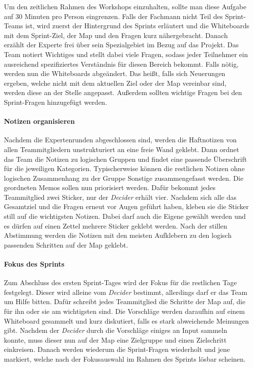 Um den zeitlichen Rahmen des Workshops einzuhalten, sollte man diese Aufgabe auf 30 Minuten pro Person eingrenzen. Falls der Fachmann nicht Teil des Sprint-Teams ist, wird zuerst der Hintergrund des Sprints erläutert und die Whiteboards mit dem Sprint-Ziel, der Map und den Fragen kurz nähergebracht. Danach erzählt der Experte frei über sein Spezialgebiet im Bezug auf das Projekt. Das Team notiert Wichtiges und stellt dabei viele Fragen, sodass jeder Teilnehmer ein ausreichend spezifiziertes Verständnis für diesen Bereich bekommt. Falls nötig, werden nun die Whiteboards abgeändert. Das heißt, falls sich Neuerungen ergeben, welche nicht mit dem aktuellen Ziel oder der Map vereinbar sind, werden diese an der Stelle angepasst. Außerdem sollten wichtige Fragen bei den Sprint-Fragen hinzugefügt werden.

\paragraph{Notizen organisieren}
\label{sec:Sprint-Tag1-Notizen}
Nachdem die Expertenrunden abgeschlossen sind, werden die Haftnotizen von allen Teammitgliedern unstrukturiert an eine freie Wand geklebt. Dann ordnet das Team die Notizen zu logischen Gruppen und findet eine passende Überschrift für die jeweiligen Kategorien. Typischerweise können die restlichen Notizen ohne logischen Zusammenhang zu der Gruppe Sonstige zusammengefasst werden.
Die geordneten Memos sollen nun priorisiert werden. Dafür bekommt jedes Teammitglied zwei Sticker, nur der \textit{Decider} erhält vier. Nachdem sich alle das Gesamtziel und die Fragen erneut vor Augen geführt haben, kleben sie die Sticker still auf die wichtigsten Notizen. Dabei darf auch die Eigene gewählt werden und es dürfen auf einen Zettel mehrere Sticker geklebt werden. Nach der stillen Abstimmung werden die Notizen mit den meisten Aufklebern zu den logisch passenden Schritten auf der Map geklebt.

\paragraph{Fokus des Sprints}
\label{sec:Sprint-Tag1-Fokus}
Zum Abschluss des ersten Sprint-Tages wird der Fokus für die restlichen Tage festgelegt. Dieser wird alleine vom \textit{Decider} bestimmt, allerdings darf er das Team um Hilfe bitten. Dafür schreibt jedes Teammitglied die Schritte der Map auf, die für ihn oder sie am wichtigsten sind. Die Vorschläge werden daraufhin auf einem Whiteboard gesammelt und kurz diskutiert, falls es stark abweichende Meinungen gibt. Nachdem der \textit{Decider} durch die Vorschläge einiges an Input sammeln konnte, muss dieser nun auf der Map eine Zielgruppe und einen Zielschritt einkreisen. Danach werden wiederum die Sprint-Fragen wiederholt und jene markiert, welche nach der Fokusauswahl im Rahmen des Sprints lösbar scheinen.

